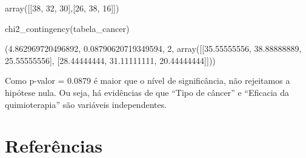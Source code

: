\documentclass[
  letterpaper,
  DIV=11,
  numbers=noendperiod]{scrreprt}
\newenvironment{Shaded}{\begin{snugshade}}{\end{snugshade}}
\newcommand{\NormalTok}[1]{\textcolor[rgb]{0.00,0.23,0.31}{#1}}
\begin{document}
\begin{tcolorbox}[enhanced jigsaw, breakable, leftrule=.75mm, left=2mm, opacityback=0, bottomrule=.15mm, toprule=.15mm, rightrule=.15mm, arc=.35mm, colback=white]

array({[}{[}38, 32, 30{]},{[}26, 38, 16{]}{]})

\end{tcolorbox}

\begin{Shaded}
\begin{Highlighting}[]
\NormalTok{chi2\_contingency(tabela\_cancer)}
\end{Highlighting}
\end{Shaded}

\begin{tcolorbox}[enhanced jigsaw, breakable, leftrule=.75mm, left=2mm, opacityback=0, bottomrule=.15mm, toprule=.15mm, rightrule=.15mm, arc=.35mm, colback=white]

(4.862969720496892, 0.08790620719349594, 2, array({[}{[}35.55555556,
38.88888889, 25.55555556{]}, {[}28.44444444, 31.11111111,
20.44444444{]}{]}))

\end{tcolorbox}

Como p-valor = 0.0879 é maior que o nível de significância, não
rejeitamos a hipótese nula. Ou seja, há evidências de que ``Tipo de
câncer'' e ``Eficacia da quimioterapia'' são variáveis independentes.


\hypertarget{referuxeancias-4}{%
\chapter{Referências}\label{referuxeancias-4}}
\end{document}

